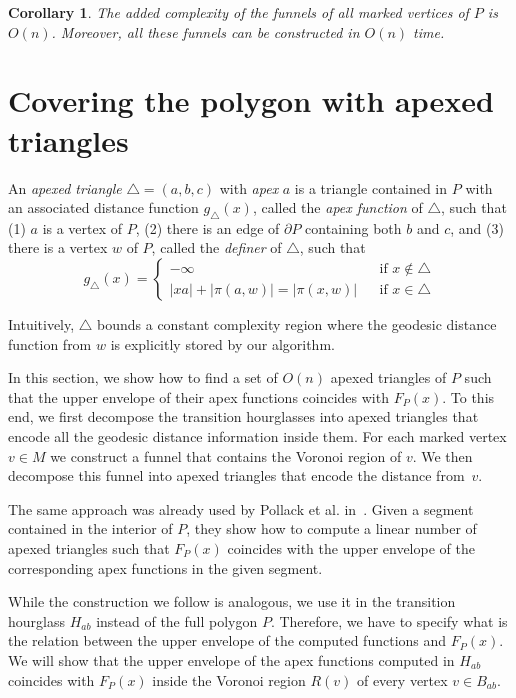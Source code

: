 \documentclass[a4paper]{article}
\newtheorem{corollary}[theorem]{Corollary}
\newcommand{\F}[2]{\ensuremath{F_{\scriptscriptstyle #1}(#2)}}
\newcommand{\g}[2]{\ensuremath{|\pi(#1, #2)|}}
\begin{document}
\begin{corollary}\label{corollary: Marked vertices funnels construction}
The added complexity of the funnels of all marked vertices of $P$ is $O(n)$. 
Moreover, all these funnels can be constructed in $O(n)$ time.
\end{corollary}



\section{Covering the polygon with apexed triangles}\label{Section:Computing apexed triangles}
An \emph{apexed triangle} $\triangle = (a,b,c)$ with \emph{apex} $a$ is a triangle contained in $P$ with an associated distance function $g_\triangle(x)$, called the \emph{apex function} of $\triangle$, such that (1) $a$ is a vertex of $P$, (2) 
there is an edge of $\partial P$ containing both $b$ and $c$, and (3) there is a  vertex $w$ of  $P$, called the \emph{definer} of $\triangle$, such that
$$g_\triangle(x) = \left\{ \begin{array}{lll}
-\infty&&\text{if $x\notin \triangle$}\\
|xa| + \g{a}{w} = \g{x}{w} && \text{if $x\in \triangle$}
\end{array}\right.$$

Intuitively, $\triangle$ bounds a constant complexity region where the geodesic distance function from $w$ is explicitly stored by our algorithm. 

In this section, we show how to find a set of $O(n)$ apexed triangles of $P$ such that the upper envelope of their apex functions coincides with $\F{P}{x}$.
To this end, we first decompose the transition hourglasses into apexed triangles that encode all the geodesic distance information inside them. For each marked vertex $v\in M$ we construct a funnel that contains the Voronoi region of $v$.  We then decompose this funnel into apexed triangles that encode the distance from~$v$.

The same approach was already used by Pollack et al. in~\cite[Section 3]{pollackComputingCenter}. 
Given a segment contained in the interior of $P$, they show 
how to compute a linear number of apexed triangles such that $\F{P}{x}$ coincides with the upper envelope of the corresponding apex functions in the given segment.

While the construction we follow is analogous, we use it in the transition hourglass $H_{ab}$ instead of the full polygon $P$. 
Therefore, we have to specify what is the relation between the upper envelope of the computed functions and $\F{P}{x}$. 
We will show that the upper envelope of the apex functions computed in $H_{ab}$ coincides with $\F{P}{x}$ inside the Voronoi region $R(v)$ of every vertex $v\in B_{ab}$.
\end{document}
